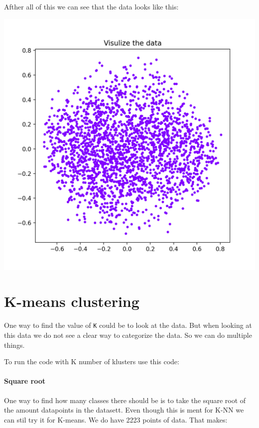 \documentclass[10pt]{article}
\begin{document}
    Afther all of this we can see that the data looks like this:

    \begin{center}
        \includegraphics[scale=0.5]{Figure_1.png}
    \end{center}

    \section{K-means clustering}
    One way to find the value of \texttt{K} could be to look at the data. But when looking at this data we do not see a clear way to categorize the data. So we can do multiple things.

    To run the code with K number of klusters use this code: 


    \paragraph{Square root}
    One way to find how many classes there should be is to take the square root of the amount datapoints in the datasett. Even though this is ment for K-NN we can stil try it for K-means. We do have 2223 points of data. That makes:
    
\end{document}
